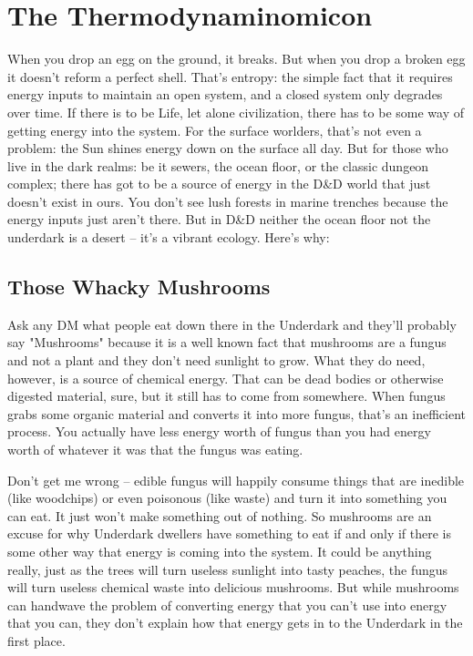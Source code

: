 \section{The Thermodynaminomicon} %
\vspace*{-10pt}

When you drop an egg on the ground, it breaks. But when you drop a broken egg it doesn't reform a perfect shell. That's entropy: the simple fact that it requires energy inputs to maintain an open system, and a closed system only degrades over time. If there is to be Life, let alone civilization, there has to be some way of getting energy into the system. For the surface worlders, that's not even a problem: the Sun shines energy down on the surface all day. But for those who live in the dark realms: be it sewers, the ocean floor, or the classic dungeon complex; there has got to be a source of energy in the D\&D world that just doesn't exist in ours. You don't see lush forests in marine trenches because the energy inputs just aren't there. But in D\&D neither the ocean floor not the underdark is a desert -- it's a vibrant ecology. Here's why:

\subsection{Those Whacky Mushrooms}

Ask any DM what people eat down there in the Underdark and they'll probably say "Mushrooms" because it is a well known fact that mushrooms are a fungus and not a plant and they don't need sunlight to grow. What they do need, however, is a source of chemical energy. That can be dead bodies or otherwise digested material, sure, but it still has to come from somewhere. When fungus grabs some organic material and converts it into more fungus, that's an inefficient process. You actually have less energy worth of fungus than you had energy worth of whatever it was that the fungus was eating.

Don't get me wrong -- edible fungus will happily consume things that are inedible (like woodchips) or even poisonous (like waste) and turn it into something you can eat. It just won't make something out of nothing. So mushrooms are an excuse for why Underdark dwellers have something to eat if and only if there is some other way that energy is coming into the system. It could be anything really, just as the trees will turn useless sunlight into tasty peaches, the fungus will turn useless chemical waste into delicious mushrooms. But while mushrooms can handwave the problem of converting energy that you can't use into energy that you can, they don't explain how that energy gets in to the Underdark in the first place.

